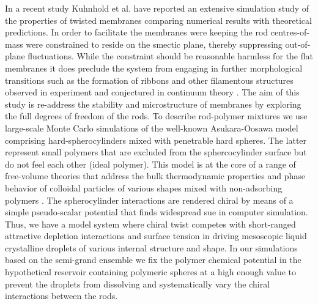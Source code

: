In a recent study Kuhnhold et al. \cite{kuhnhold2022colloidal} have reported an extensive simulation study of the properties of twisted membranes comparing numerical results with theoretical predictions. In order to facilitate the membranes were keeping the rod centres-of-mass were constrained to reside on the smectic plane, thereby suppressing out-of-plane fluctuations. While the constraint should be reasonable harmless for the flat membranes it does preclude the system from engaging in further morphological transitions such as the formation of ribbons and other filamentous structures observed in experiment \cite{Gibaud2012} and conjectured in continuum theory \cite{kaplan2010theory,kang_sm2016}. The aim of this study is re-address the stability and microstructure of membranes by exploring the full degrees of freedom of the rods. To describe rod-polymer mixtures we use large-scale Monte Carlo simulations of the well-known Asukara-Oosawa model comprising hard-spherocylinders mixed with penetrable hard spheres. The latter represent small polymers that are excluded from the sphercocylinder surface but do not feel each other (ideal polymer). This model is at the core of a range of free-volume theories that address the bulk thermodynamic properties and phase behavior of colloidal particles of  various shapes mixed with non-adsorbing polymers \cite{LekkerkerkerTuinier2011}. The spherocylinder interactions are rendered chiral by means of a simple pseudo-scalar potential that finds widespread sue in computer simulation. Thus, we have a model system where chiral twist competes with short-ranged attractive depletion interactions and surface tension in driving mesoscopic liquid crystalline droplets of various internal structure and shape.  In our simulations based on the semi-grand ensemble we fix the polymer chemical potential in the hypothetical reservoir containing polymeric spheres at a high enough value to prevent the droplets from dissolving and systematically vary the chiral interactions between the rods.




